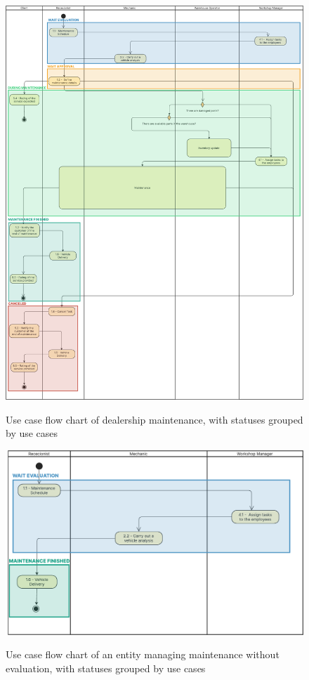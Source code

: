 \begin{figure}[h]
  \caption{Use case flow chart of dealership maintenance, with statuses grouped by use cases}
  \centering
  \includegraphics[width=\textwidth]{figs/Status/Maintenance/UseCaseStatus}
  \label{fig:maintenanceUseCaseStatus}
\end{figure}


\begin{figure}[h]
  \caption{Use case flow chart of an entity managing maintenance without evaluation, with statuses grouped by use cases}
  \centering
  \includegraphics[width=\textwidth]{figs/Status/Maintenance/EntityDiagram}
  \label{fig:maintenanceDealershipUseCaseStatus}
\end{figure}



